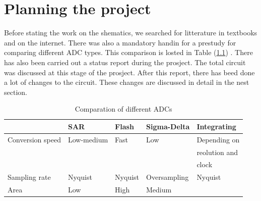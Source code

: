 \documentclass[english, 12pt, a4paper]{ifimaster}
\begin{document}
\chapter{Planning the project} 
Before stating the work on the shematics, we searched for litterature in textbooks and on the internet. There was also a mandatory handin for a prestudy for comparing different ADC types. This 
comparison is losted in Table (\ref{comp:adc}) \cite{forstudie}. There has also been carried out a status report during the prosject. The total circuit was discussed at this stage of the prosject.
After this report, there has beed done a lot of changes to the circuit. These changes are discussed in detail in the nest section. 

\begin{table}[!ht]
 \centering
 \begin{tabular}{|l|l|l|l|l|}
  \hline
                   & SAR        & Flash   & Sigma-Delta  & Integrating          \\ \hline
  Conversion speed & Low-medium & Fast    & Low          & Depending on 	\\
		   &	        &	  &		 & reolution and 	\\
		   &		&	  &		 & clock 		\\ \hline
  Sampling rate    & Nyquist    & Nyquist & Oversampling & Nyquist              \\ \hline
  Area             & Low        & High    & Medium       &                      \\ \hline
 \end{tabular}
 \caption{Comparation of different ADCs}
 \label{comp:adc}
\end{table}
\end{document}
